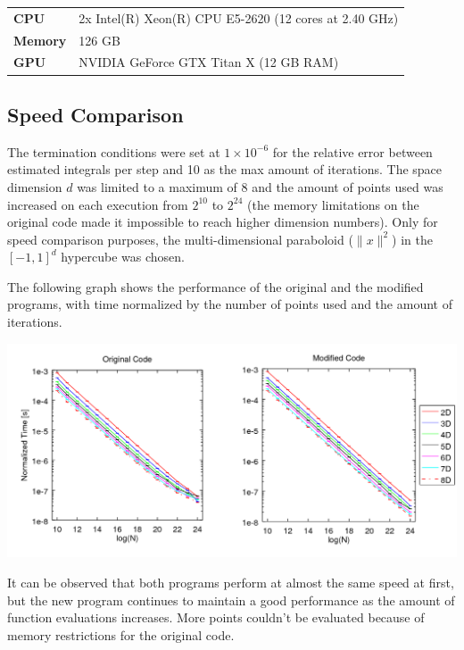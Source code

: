 \documentclass[english]{maciarticle}
\begin{document}
\begin{center}
	\begin{tabular}{ll}
		\hline
		\textbf{CPU} & 2x Intel(R) Xeon(R) CPU E5-2620 (12 cores at 2.40 GHz) \\
		\textbf{Memory} & 126 GB \\
		\textbf{GPU} & NVIDIA GeForce GTX Titan X (12 GB RAM)\\
		\hline
	\end{tabular}
\end{center}



\subsection*{Speed Comparison}

The termination conditions were set at $1 \times 10^{-6}$ for the relative error between estimated integrals per step and 10 as the max amount of iterations. The space dimension $d$ was limited to a maximum of 8 and the amount of points used was increased on each execution from $2^{10}$ to $2^{24}$ (the memory limitations on the original code made it impossible to reach higher dimension numbers). Only for speed comparison purposes, the multi-dimensional paraboloid ($\|x\|^2$) in the $[-1,1]^d$ hypercube was chosen.

The following graph shows the performance of the original and the modified programs, with time normalized by the number of points used and the amount of iterations.

\begin{center}
	\includegraphics[width = .9\textwidth]{comparison.png}
\end{center}

It can be observed that both programs perform at almost the same speed at first, but the new program continues to maintain a good performance as the amount of function evaluations increases. More points couldn't be evaluated because of memory restrictions for the original code.
\end{document}
